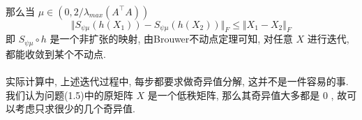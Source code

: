\documentclass[UTF8]{ctexart}
\numberwithin{equation}{section}
\begin{document}
		\paragraph{}\quad 那么当 $\mu \in (0, 2/\lambda_{max}(A ^\top A))$
			\begin{equation}
				\Vert{S_{\psi \mu}(h(X_1)) - S_{\psi \mu}(h(X_2))}\Vert_F \le \Vert{X_1 - X_2}\Vert_F
			\end{equation}
			即 $S_{\psi \mu} \circ h$ 是一个非扩张的映射, 由Brouwer不动点定理可知, 对任意 $X$ 进行迭代, 都能收敛到某个不动点.

		\paragraph{}\quad 实际计算中, 上述迭代过程中, 每步都要求做奇异值分解, 这并不是一件容易的事. 我们认为问题(1.5)中的原矩阵 $X$ 是一个低秩矩阵, 那么其奇异值大多都是 $0$ , 故可以考虑只求很少的几个奇异值.
\end{document}
